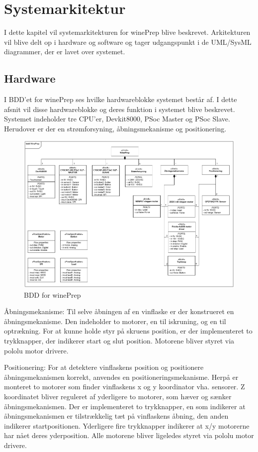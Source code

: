\chapter{Systemarkitektur}
I dette kapitel vil systemarkitekturen for winePrep blive beskrevet. Arkitekturen vil blive delt op i hardware og software og tager udgangspunkt 
i de UML/SysML diagrammer, der er lavet over systemet. 

\section{Hardware}
I BDD'et for winePrep ses hvilke hardwareblokke systemet består af. I dette afsnit vil disse hardwareblokke og deres funktion i systemet blive beskrevet.
Systemet indeholder tre CPU'er, Devkit8000, PSoc Master og PSoc Slave. Herudover er der en strømforsyning, åbningsmekanisme og positionering. 

\begin{figure}[H]
\includegraphics[scale=0.8]{Hardware/BDD_winePrep}
\caption{BDD for winePrep}
\end{figure}

Åbningsmekanisme:
Til selve åbningen af en vinflaske er der konstrueret en åbningsmekanisme. Den indeholder to motorer, en til iskruning, og en til optrækning.
For at kunne holde styr på skruens position, er der implementeret to trykknapper, der indikerer start og slut position. Motorene bliver styret via 
pololu motor drivere.   

Positionering:
For at detektere vinflaskens position og positionere åbningsmekanismen korrekt, anvendes en positioneringsmekanisme. Herpå er monteret to motorer som finder
vinflaskens x og y koordinator vha. sensorer. Z koordinatet bliver reguleret af yderligere to motorer, som hæver og sænker åbningsmekanismen. 
Der er implementeret to trykknapper, en som indikerer at åbningsmekanismen er tilstrækkelig tæt på vinflaskens åbning, den anden indikerer startpositionen. 
Yderligere fire trykknapper indikerer at x/y motorerne har nået deres yderposition. Alle motorene bliver ligeledes styret via pololu motor drivere.        
      
